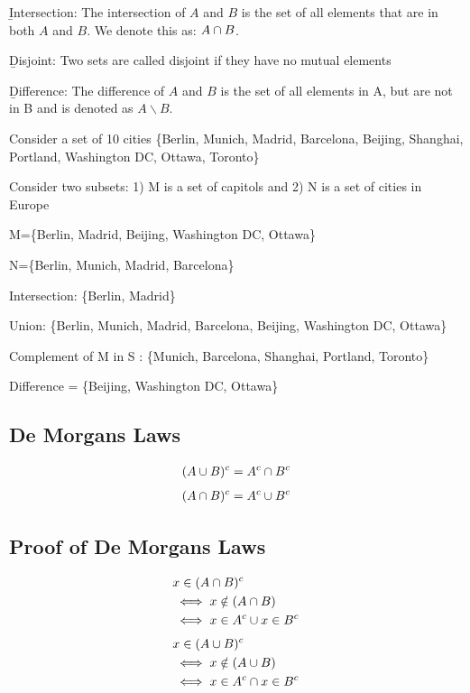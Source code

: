 \documentclass[12pt, titlepage, oneside]{article}
\begin{document}
\b{Intersection}: The intersection of $A$ and $B$ is the set of all elements that are in both $A$ and $B$. We denote this as: $A\cap B$.

\b{Disjoint}: Two sets are called disjoint if they have no mutual elements

\b{Difference}: The difference of $A$ and $B$ is the set of all elements in A, but are not in B and is denoted as $A \backslash B$.

\ex Consider a set of 10 cities \{Berlin, Munich, Madrid, Barcelona, Beijing, Shanghai,  Portland, Washington DC, Ottawa, Toronto\}

Consider two subsets: 1) M is a set of capitols and 2) N is a set of cities in Europe

M=\{Berlin, Madrid, Beijing, Washington DC, Ottawa\}

N=\{Berlin, Munich, Madrid, Barcelona\}

\items
\item Intersection: \{Berlin, Madrid\}
\item Union: \{Berlin, Munich, Madrid, Barcelona, Beijing, Washington DC, Ottawa\}
\item Complement of M in S : \{Munich, Barcelona, Shanghai, Portland, Toronto\}
\item Difference  = \{Beijing, Washington DC, Ottawa\}
\eitems


\subsection{De Morgans Laws}

\begin{align}
(A \cup B)^c = A^c \cap B^c
\end{align}
\begin{align}
(A \cap B)^c = A^c \cup B^c
\end{align}



\subsection{Proof of De Morgans Laws}

\begin{align*}
&x \in (A \cap B)^c\\
&\iff x \notin (A \cap B) \\
&\iff x \in A^c \cup x \in B^c
\end{align*}
\begin{align*}
&x \in (A \cup B)^c\\
&\iff x \notin (A \cup B)\\
&\iff x \in A^c \cap x \in B^c
\end{align*}
\end{document}
